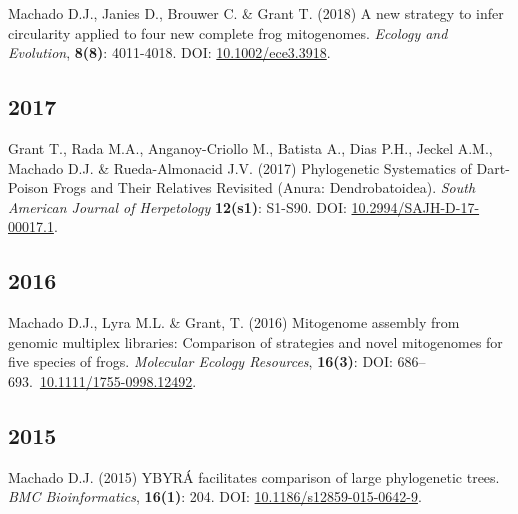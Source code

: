     {\setlength{\parskip}{.5em}\renewcommand{\baselinestretch}{2.0}\begin{hangparas}{.25in}{1}
		Machado D.J., Janies D., Brouwer C. \& Grant T. (2018) A new strategy to infer circularity applied to four new complete frog mitogenomes. \emph{Ecology and Evolution}, \textbf{8(8)}: 4011-4018. DOI: \href{http://doi.wiley.com/10.1002/ece3.3918}{10.1002/ece3.3918}.
	\end{hangparas}}


\subsection{2017}

    {\setlength{\parskip}{.5em}\renewcommand{\baselinestretch}{2.0}\begin{hangparas}{.25in}{1}
		Grant T., Rada M.A., Anganoy-Criollo M., Batista A., Dias P.H., Jeckel A.M., Machado D.J. \& Rueda-Almonacid J.V. (2017) Phylogenetic Systematics of Dart-Poison Frogs and Their Relatives Revisited (Anura: Dendrobatoidea). \emph{South American Journal of Herpetology} \textbf{12(s1)}: S1-S90. DOI: \href{http://www.bioone.org/doi/10.2994/SAJH-D-17-00017.1}{10.2994/SAJH-D-17-00017.1}.
	\end{hangparas}}


\subsection{2016}

    {\setlength{\parskip}{.5em}\renewcommand{\baselinestretch}{2.0}\begin{hangparas}{.25in}{1}
		Machado D.J., Lyra M.L. \& Grant, T. (2016) Mitogenome assembly from genomic multiplex libraries: Comparison of strategies and novel mitogenomes for five species of frogs. \emph{Molecular Ecology Resources}, \textbf{16(3)}: DOI: 686--693.~\href{https://doi.org/10.1111/1755-0998.12492}{10.1111/1755-0998.12492}.
	\end{hangparas}}


\subsection{2015}

    {\setlength{\parskip}{.5em}\renewcommand{\baselinestretch}{2.0}\begin{hangparas}{.25in}{1}
		Machado D.J. (2015) YBYRÁ facilitates comparison of large phylogenetic trees. \emph{BMC Bioinformatics}, \textbf{16(1)}: 204. DOI: \href{https://doi.org/10.1186/s12859-015-0642-9}{10.1186/s12859-015-0642-9}.
	\end{hangparas}}

